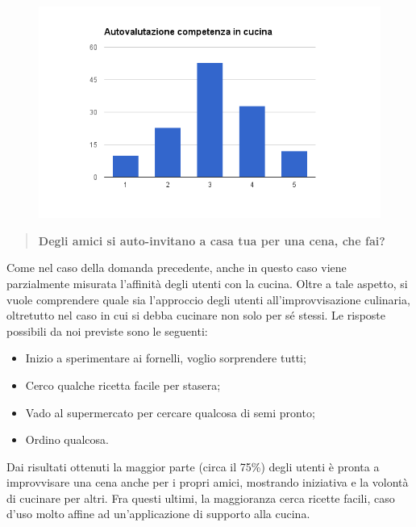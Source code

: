 \begin{figure}[H]
	\centering
	\includegraphics[scale=0.6]{img/chart_bravura_cucina}
\end{figure}

\begin{quote}
	\textbf{Degli amici si auto-invitano a casa tua per una cena, che fai?}
\end{quote}

Come nel caso della domanda precedente, anche in questo caso viene parzialmente misurata l'affinità degli utenti con la cucina.
Oltre a tale aspetto, si vuole comprendere quale sia l'approccio degli utenti all'improvvisazione culinaria, oltretutto
nel caso in cui si debba cucinare non solo per sé stessi. Le risposte possibili da noi previste sono le seguenti:
\begin{itemize}
 \item Inizio a sperimentare ai fornelli, voglio sorprendere tutti;
 \item Cerco qualche ricetta facile per stasera;
 \item Vado al supermercato per cercare qualcosa di semi pronto;
 \item Ordino qualcosa.
\end{itemize}

Dai risultati ottenuti la maggior parte (circa il 75\%) degli utenti è pronta a improvvisare una cena anche per i propri amici, mostrando
iniziativa e la volontà di cucinare per altri. Fra questi ultimi, la maggioranza cerca ricette facili, caso d'uso molto affine
ad un'applicazione di supporto alla cucina.

